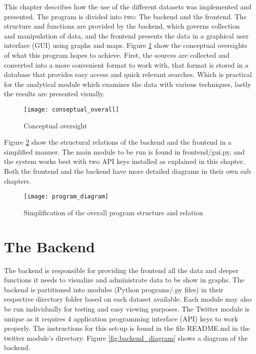 This chapter describes how the use of the different datasets was implemented and presented. The program is divided into two: The backend and the frontend. The structure and functions are provided by the backend, which governs collection and manipulation of data, and the frontend presents the data in a graphical user interface (GUI) using graphs and maps. 
Figure \ref{fig:Conceptual_o} show the conceptual oversights of what this program hopes to achieve. First, the sources are collected and converted into a more convenient format to work with, that format is stored in a database that provides easy access and quick relevant searches. Which is practical for the analytical module which examines the data with various techniques, lastly the results are presented visually.

\begin{figure}[h]
\texttt{[image: conseptual\_overall]}
\centering
\caption{Conceptual oversight}
\label{fig:Conceptual_o}
\end{figure}


\newpage


Figure \ref{fig:program} show the structural relations of the backend and the frontend in a simplified manner. The main module to be run is found in frontend/gui.py, and the system works best with two API keys installed as explained in this chapter. Both the frontend and the backend have more detailed diagrams in their own sub chapters.

\begin{figure}[h]
\texttt{[image: program\_diagram]}
\centering
\caption{Simplification of the overall program structure and relation}
\label{fig:program}
\end{figure}


\newpage



\section{The Backend}
The backend is responsible for providing the frontend all the data and deeper functions it needs to visualize and administrate data to be show in graphs. The backend is partitioned into modules (Python programs/.py files) in their respective directory folder based on each dataset available. Each module may also be run individually for testing and easy viewing purposes. 
The Twitter module is unique as it requires 4 application programming interface (API) keys to work properly. The instructions for this set-up is found in the file README.md in the twitter module's directory. Figure \ref{fig:backend_diagram} shows a diagram of the backend.

